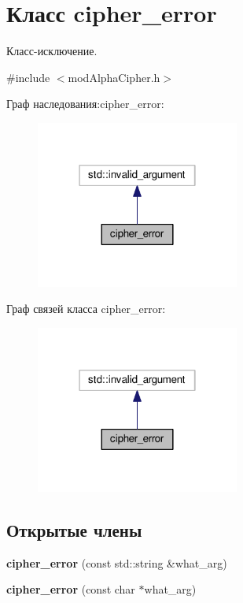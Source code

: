 \hypertarget{classcipher__error}{}\section{Класс cipher\+\_\+error}
\label{classcipher__error}


Класс-\/исключение.  




{\ttfamily \#include $<$mod\+Alpha\+Cipher.\+h$>$}



Граф наследования\+:cipher\+\_\+error\+:
\nopagebreak
\begin{figure}[H]
\begin{center}
\leavevmode
\includegraphics[width=190pt]{classcipher__error__inherit__graph}
\end{center}
\end{figure}


Граф связей класса cipher\+\_\+error\+:
\nopagebreak
\begin{figure}[H]
\begin{center}
\leavevmode
\includegraphics[width=190pt]{classcipher__error__coll__graph}
\end{center}
\end{figure}
\subsection*{Открытые члены}
\begin{DoxyCompactItemize}
\item 
\mbox{\label{classcipher__error_aac662e216a84bfeb873303c7b88d029e}} 
{\bfseries cipher\+\_\+error} (const std\+::string \&what\+\_\+arg)
\item 
\mbox{\label{classcipher__error_a18cf27d9c2cd2538d3cb8f17e9a55f3e}} 
{\bfseries cipher\+\_\+error} (const char $\ast$what\+\_\+arg)
\end{DoxyCompactItemize}


